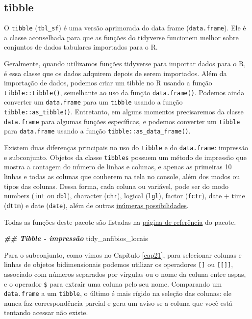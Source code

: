 \documentclass[
]{article}
\newenvironment{Shaded}{\begin{snugshade}}{\end{snugshade}}
\newcommand{\DocumentationTok}[1]{\textcolor[rgb]{0.56,0.35,0.01}{\textbf{\textit{#1}}}}
\newcommand{\NormalTok}[1]{#1}
\begin{document}
\hypertarget{tibble}{%
\subsection{tibble}\label{tibble}}

O \texttt{tibble} (\texttt{tbl\_sf}) é uma versão aprimorada do data frame (\texttt{data.frame}). Ele é a classe aconselhada para que as funções do tidyverse funcionem melhor sobre conjuntos de dados tabulares importados para o R.

Geralmente, quando utilizamos funções tidyverse para importar dados para o R, é essa classe que os dados adquirem depois de serem importados. Além da importação de dados, podemos criar um tibble no R usando a função \texttt{tibble::tibble()}, semelhante ao uso da função \texttt{data.frame()}. Podemos ainda converter um \texttt{data.frame} para um \texttt{tibble} usando a função \texttt{tibble::as\_tibble()}. Entretanto, em alguns momentos precisaremos da classe \texttt{data.frame} para algumas funções específicas, e podemos converter um \texttt{tibble} para \texttt{data.frame} usando a função \texttt{tibble::as\_data\_frame()}.

Existem duas diferenças principais no uso do \texttt{tibble} e do \texttt{data.frame}: impressão e subconjunto. Objetos da classe \texttt{tibbles} possuem um método de impressão que mostra a contagem do número de linhas e colunas, e apenas as primeiras 10 linhas e todas as colunas que couberem na tela no console, além dos modos ou tipos das colunas. Dessa forma, cada coluna ou variável, pode ser do modo numbers (\texttt{int} ou \texttt{dbl}), character (\texttt{chr}), logical (\texttt{lgl}), factor (\texttt{fctr}), date + time (\texttt{dttm}) e date (\texttt{date}), além de outras \href{https://tibble.tidyverse.org/articles/types.html}{inúmeras possibilidades}.

Todas as funções deste pacote são listadas na \href{https://tibble.tidyverse.org/reference/index.html}{página de referência} do pacote.

\begin{Shaded}
\begin{Highlighting}[]
\DocumentationTok{\#\# Tibble {-} impressão}
\NormalTok{tidy\_anfibios\_locais}
\end{Highlighting}
\end{Shaded}

Para o subconjunto, como vimos no Capítulo \ref{cap21}, para selecionar colunas e linhas de objetos bidimensionais podemos utilizar os operadores \texttt{{[}{]}} ou \texttt{{[}{[}{]}{]}}, associado com números separados por vírgulas ou o nome da coluna entre aspas, e o operador \texttt{\$} para extrair uma coluna pelo seu nome. Comparando um \texttt{data.frame} a um \texttt{tibble}, o último é mais rígido na seleção das colunas: ele nunca faz correspondência parcial e gera um aviso se a coluna que você está tentando acessar não existe.
\end{document}
